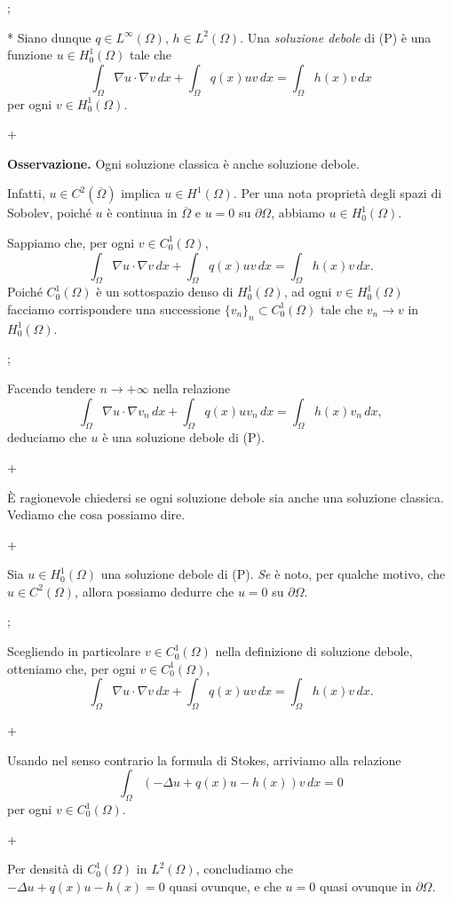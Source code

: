 \pg;

* Siano dunque $q \in L^\infty(\Omega)$, $h \in
L^2(\Omega)$. Una {\em soluzione debole} di (P) \`e una funzione $u
\in H_0^1(\Omega)$ tale che
$$
\int_\Omega \nabla u \cdot \nabla v \, dx + \int_\Omega q(x) u v \, dx
= \int_\Omega h(x) v \, dx
$$
per ogni $v \in H_0^1(\Omega)$.

\pg+

{\bf Osservazione.} Ogni soluzione classica \`e anche soluzione
debole.

Infatti, $u \in C^2(\overline{\Omega})$ implica $u \in
H^1(\Omega)$. Per una nota propriet\`a degli spazi di Sobolev,
poich\'e $u$ \`e continua in $\overline{\Omega}$ e $u=0$ su
$\partial\Omega$, abbiamo $u \in H_0^1(\Omega)$.

Sappiamo che, per ogni $v \in C_0^1(\Omega)$,
$$
\int_\Omega \nabla u \cdot \nabla v \, dx + \int_\Omega q(x) u v \, dx
= \int_\Omega h(x)v \, dx.
$$
Poich\'e $C_0^1(\Omega)$ \`e un sottospazio denso di $H_0^1(\Omega)$,
ad ogni $v \in H_0^1(\Omega)$ facciamo corrispondere una successione
$\{v_n\}_n \subset C_0^1(\Omega)$ tale che $v_n \to v$ in
$H_0^1(\Omega)$.

\pg;

Facendo tendere $n \to +\infty$ nella relazione
$$
\int_\Omega \nabla u \cdot \nabla v_n \, dx + \int_\Omega q(x) u v_n \, dx
= \int_\Omega h(x)v_n \, dx,
$$
deduciamo che $u$ \`e una soluzione debole di (P).

\pg+

\`E ragionevole chiedersi se ogni soluzione debole sia anche una
soluzione classica. Vediamo che cosa possiamo dire.

\pg+

Sia $u \in H_0^1(\Omega)$ una soluzione debole di (P). {\em Se} \`e
noto, per qualche motivo, che $u \in C^2(\Omega)$, allora possiamo
dedurre che $u=0$ su $\partial\Omega$.

\pg;

Scegliendo in particolare $v \in C_0^1(\Omega)$ nella definizione di
soluzione debole, otteniamo che, per ogni $v \in C_0^1(\Omega)$,
$$
\int_\Omega \nabla u \cdot \nabla v \, dx + \int_\Omega q(x) u v \, dx
= \int_\Omega h(x)v \, dx.
$$

\pg+

Usando nel senso contrario la formula di Stokes, arriviamo alla
relazione
$$
\int_\Omega \left( -\Delta u + q(x) u -h(x) \right) v\, dx=0
$$
per ogni $v \in C_0^1(\Omega)$.

\pg+

Per densit\`a di $C_0^1(\Omega)$ in $L^2(\Omega)$, concludiamo che
$-\Delta u + q(x) u -h(x)=0$ quasi ovunque, e che $u=0$ quasi ovunque
in $\partial\Omega$.

